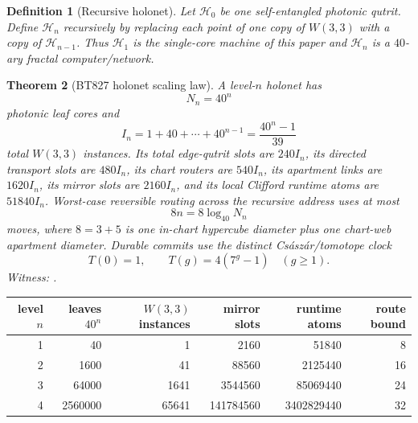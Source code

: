\documentclass[11pt]{article}
\newtheorem{theorem}{Theorem}[section]
\newtheorem{definition}[theorem]{Definition}
\newcommand{\W}{W(3,3)}
\begin{document}
\begin{definition}[Recursive holonet]
Let $\mathcal{H}_0$ be one self-entangled photonic qutrit.  Define
$\mathcal{H}_n$ recursively by replacing each point of one copy of
$\W$ with a copy of $\mathcal{H}_{n-1}$.  Thus $\mathcal{H}_1$ is the
single-core machine of this paper and $\mathcal{H}_n$ is a
$40$-ary fractal computer/network.
\end{definition}

\begin{theorem}[BT827 holonet scaling law]
A level-$n$ holonet has
\[
N_n=40^n
\]
photonic leaf cores and
\[
I_n=1+40+\cdots+40^{n-1}=\frac{40^n-1}{39}
\]
total $\W$ instances.  Its total edge-qutrit slots are $240I_n$, its
directed transport slots are $480I_n$, its chart routers are
$540I_n$, its apartment links are $1620I_n$, its mirror slots are
$2160I_n$, and its local Clifford runtime atoms are $51840I_n$.
Worst-case reversible routing across the recursive address uses at
most
\[
8n=8\log_{40}N_n
\]
moves, where $8=3+5$ is one in-chart hypercube diameter plus one
chart-web apartment diameter.  Durable commits use the distinct
Cs\'asz\'ar/tomotope clock
\[
T(0)=1,\qquad T(g)=4(7^g-1)\quad(g\ge1).
\]
\emph{Witness: .}
\end{theorem}

\begin{center}\small
\begin{tabular}{rrrrrr}
\toprule
level $n$ & leaves $40^n$ & $\W$ instances & mirror slots & runtime atoms & route bound\\
\midrule
1 & 40 & 1 & 2160 & 51840 & 8\\
2 & 1600 & 41 & 88560 & 2125440 & 16\\
3 & 64000 & 1641 & 3544560 & 85069440 & 24\\
4 & 2560000 & 65641 & 141784560 & 3402829440 & 32\\
\bottomrule
\end{tabular}
\end{center}
\end{document}
